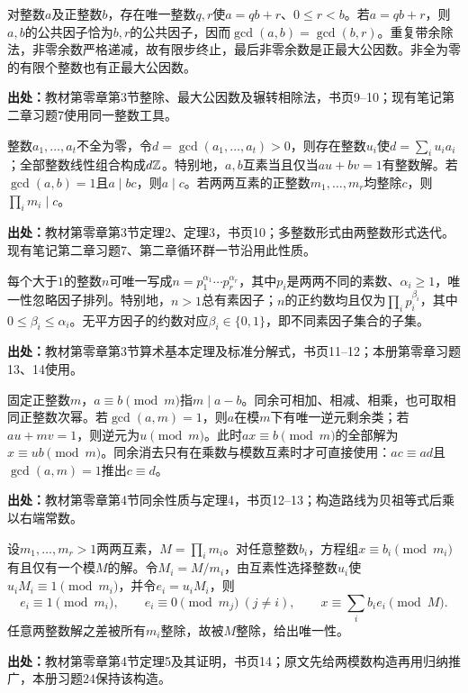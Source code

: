 \begin{reviewtheorem}[带余除法与欧几里得算法]\label{tool:n-gcd}
对整数$a$及正整数$b$，存在唯一整数$q,r$使$a=qb+r$、$0\le r<b$。若$a=qb+r$，则$a,b$的公共因子恰为$b,r$的公共因子，因而$\gcd(a,b)=\gcd(b,r)$。重复带余除法，非零余数严格递减，故有限步终止，最后非零余数是正最大公因数。非全为零的有限个整数也有正最大公因数。

\textbf{出处：}教材第零章第3节整除、最大公因数及辗转相除法，书页9--10；现有笔记第二章习题7使用同一整数工具。
\end{reviewtheorem}

\begin{reviewtheorem}[贝祖等式与互素整除]\label{tool:n-bezout}
整数$a_1,\ldots,a_t$不全为零，令$d=\gcd(a_1,\ldots,a_t)>0$，则存在整数$u_i$使$d=\sum_i u_ia_i$；全部整数线性组合构成$d\mathbb Z$。特别地，$a,b$互素当且仅当$au+bv=1$有整数解。若$\gcd(a,b)=1$且$a\mid bc$，则$a\mid c$。若两两互素的正整数$m_1,\ldots,m_r$均整除$c$，则$\prod_i m_i\mid c$。

\textbf{出处：}教材第零章第3节定理2、定理3，书页10；多整数形式由两整数形式迭代。现有笔记第二章习题7、第二章循环群一节沿用此性质。
\end{reviewtheorem}

\begin{reviewtheorem}[算术基本定理与素因子]\label{tool:n-prime-factor}
每个大于$1$的整数$n$可唯一写成$n=p_1^{\alpha_1}\cdots p_r^{\alpha_r}$，其中$p_i$是两两不同的素数、$\alpha_i\ge1$，唯一性忽略因子排列。特别地，$n>1$总有素因子；$n$的正约数均且仅为$\prod_i p_i^{\beta_i}$，其中$0\le\beta_i\le\alpha_i$。无平方因子的约数对应$\beta_i\in\{0,1\}$，即不同素因子集合的子集。

\textbf{出处：}教材第零章第3节算术基本定理及标准分解式，书页11--12；本册第零章习题13、14使用。
\end{reviewtheorem}

\begin{reviewprop}\label{tool:n-congruence}
固定正整数$m$，$a\equiv b\pmod m$指$m\mid a-b$。同余可相加、相减、相乘，也可取相同正整数次幂。若$\gcd(a,m)=1$，则$a$在模$m$下有唯一逆元剩余类；若$au+mv=1$，则逆元为$u\pmod m$。此时$ax\equiv b\pmod m$的全部解为$x\equiv ub\pmod m$。同余消去只有在乘数与模数互素时才可直接使用：$ac\equiv ad$且$\gcd(a,m)=1$推出$c\equiv d$。

\textbf{出处：}教材第零章第4节同余性质与定理4，书页12--13；构造路线为贝祖等式后乘以右端常数。
\end{reviewprop}

\begin{reviewtheorem}[孙子定理及原文构造]\label{tool:n-crt}
设$m_1,\ldots,m_r>1$两两互素，$M=\prod_i m_i$。对任意整数$b_i$，方程组$x\equiv b_i\pmod{m_i}$有且仅有一个模$M$的解。令$M_i=M/m_i$，由互素性选择整数$u_i$使$u_iM_i\equiv1\pmod{m_i}$，并令$e_i=u_iM_i$，则
\[
e_i\equiv1\pmod{m_i},\qquad e_i\equiv0\pmod{m_j}\ (j\ne i),\qquad
x\equiv\sum_i b_i e_i\pmod M.
\]
任意两整数解之差被所有$m_i$整除，故被$M$整除，给出唯一性。

\textbf{出处：}教材第零章第4节定理5及其证明，书页14；原文先给两模数构造再用归纳推广，本册习题24保持该构造。
\end{reviewtheorem}

